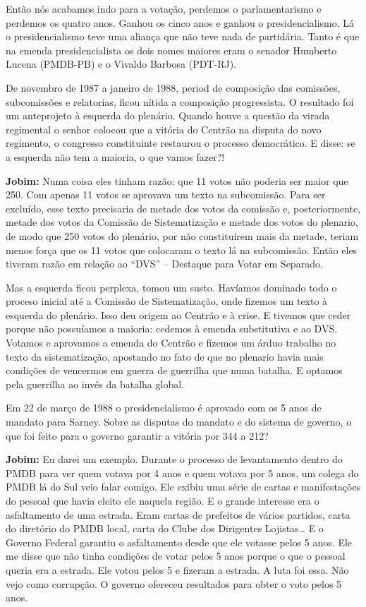 Então nós acabamos indo para a votação, perdemos o parlamentarismo e
perdemos os quatro anos. Ganhou os cinco anos e ganhou o
presidencialismo. Lá o presidencialismo teve uma aliança que não teve
nada de partidária. Tanto é que na emenda presidencialista os dois nomes
maiores eram o senador Humberto Lucena (PMDB-PB) e o Vivaldo Barbosa
(PDT-RJ).

De novembro de 1987 a janeiro de 1988, period de composição das
comissões, subcomissões e relatorias, ficou nítida a composição
progressista. O resultado foi um anteprojeto à esquerda do plenário.
Quando houve a questão da virada regimental o senhor colocou que a
vitória do Centrão na disputa do novo regimento, o congresso
constituinte restaurou o processo democrático. E disse: se a esquerda
não tem a maioria, o que vamos fazer?!

\textbf{Jobim:} Numa coisa eles tinham razão: que 11 votos não poderia
ser maior que 250. Com apenas 11 votos se aprovava um texto na
subcomissão. Para ser excluído, esse texto precisaria de metade dos
votos da comissão e, posteriormente, metade dos votos da Comissão de
Sistematização e metade dos votos do plenario, de modo que 250 votos do
plenário, por não constituírem mais da metade, teriam menos força que os
11 votos que colocaram o texto lá na subcomissão. Então eles tiveram
razão em relação ao ``DVS'' -- Destaque para Votar em Separado.

Mas a esquerda ficou perplexa, tomou um susto. Havíamos dominado todo o
proceso inicial até a Comissão de Sistematização, onde fizemos um texto
à esquerda do plenário. Isso deu origem ao Centrão e à crise. E tivemos
que ceder porque não possuíamos a maioria: cedemos à emenda substitutiva
e ao DVS. Votamos e aprovamos a emenda do Centrão e fizemos um árduo
trabalho no texto da sistematização, apostando no fato de que no
plenario havia mais condições de vencermos em guerra de guerrilha que
numa batalha. E optamos pela guerrilha ao invés da batalha global.

Em 22 de março de 1988 o presidencialismo é aprovado com os 5 anos de
mandato para Sarney. Sobre as disputas do mandato e do sistema de
governo, o que foi feito para o governo garantir a vitória por 344 a
212?

\textbf{Jobim:} Eu darei um exemplo. Durante o processo de levantamento
dentro do PMDB para ver quem votava por 4 anos e quem votava por 5 anos,
um colega do PMDB lá do Sul veio falar comigo. Ele exibiu uma série de
cartas e manifestações do pessoal que havia eleito ele naquela região. E
o grande interesse era o asfaltamento de uma estrada. Eram cartas de
prefeitos de vários partidos, carta do diretório do PMDB local, carta do
Clube dos Dirigentes Lojistas\ldots{} E o Governo Federal garantiu o
asfaltamento desde que ele votasse pelos 5 anos. Ele me disse que não
tinha condições de votar pelos 5 anos porque o que o pessoal queria era
a estrada. Ele votou pelos 5 e fizeram a estrada. A luta foi essa. Não
vejo como corrupção. O governo ofereceu resultados para obter o voto
pelos 5 anos.

